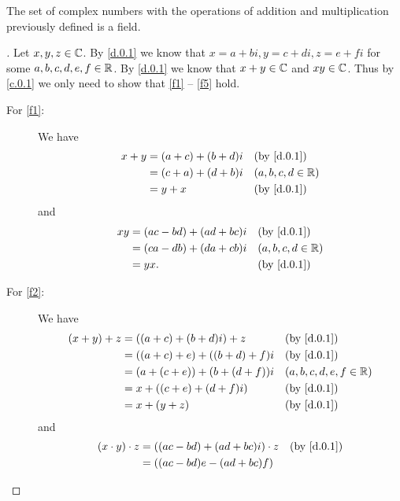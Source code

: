 \begin{thm}\label{d.1}
  The set of complex numbers with the operations of addition and multiplication previously defined is a field.
\end{thm}

\begin{proof}[]
  Let \(x, y, z \in \mathbb{C}\).
  By \cref{d.0.1} we know that \(x = a + bi, y = c + di, z = e + fi\) for some \(a, b, c, d, e, f \in \mathbb{R}\).
  By \cref{d.0.1} we know that \(x + y \in \mathbb{C}\) and \(xy \in \mathbb{C}\).
  Thus by \cref{c.0.1} we only need to show that \ref{f1} -- \ref{f5} hold.
  \begin{description}
    \item[For \ref{f1}:]
      We have
      \begin{align*}
        x + y & = (a + c) + (b + d) i &  & \text{(by \cref{d.0.1})} \\
              & = (c + a) + (d + b) i &  & (a, b, c, d \in \R)      \\
              & = y + x               &  & \text{(by \cref{d.0.1})}
      \end{align*}
      and
      \begin{align*}
        xy & = (ac - bd) + (ad + bc) i &  & \text{(by \cref{d.0.1})} \\
           & = (ca - db) + (da + cb) i &  & (a, b, c, d \in \R)      \\
           & = yx.                     &  & \text{(by \cref{d.0.1})}
      \end{align*}
    \item[For \ref{f2}:]
      We have
      \begin{align*}
        (x + y) + z & = ((a + c) + (b + d)i) + z        &  & \text{(by \cref{d.0.1})}  \\
                    & = ((a + c) + e) + ((b + d) + f) i &  & \text{(by \cref{d.0.1})}  \\
                    & = (a + (c + e)) + (b + (d + f)) i &  & (a, b, c, d, e, f \in \R) \\
                    & = x + ((c + e) + (d + f)i)        &  & \text{(by \cref{d.0.1})}  \\
                    & = x + (y + z)                     &  & \text{(by \cref{d.0.1})}
      \end{align*}
      and
      \begin{align*}
        (x \cdot y) \cdot z & = ((ac - bd) + (ad + bc) i) \cdot z   &  & \text{(by \cref{d.0.1})}  \\
                            & = ((ac - bd) e - (ad + bc) f)                                        \\

\end{align*}
\end{description}
\end{proof}

